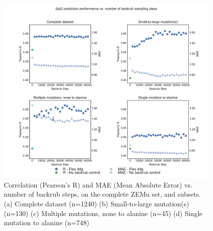 \begin{figure}
  \includegraphics[width=\textwidth,keepaspectratio]{steps-v-corr.pdf}
  \caption[Flex ddG performance vs. number of backrub steps]{
    Correlation (Pearson's R) and MAE (Mean Absolute Error) vs. number of backrub steps, on the complete ZEMu set, and subsets.
    (a) Complete dataset (n=1240)
    (b) Small-to-large mutation(s) (n=130)
    (c) Multiple mutations, none to alanine (n=45)
    (d) Single mutation to alanine (n=748)
  } \label{fig:steps-v-corr}
\end{figure}
